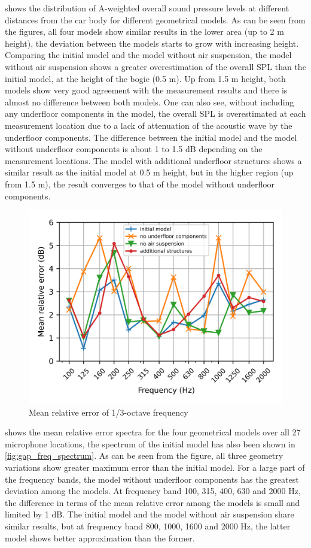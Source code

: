 \noindent{} shows the distribution of  A-weighted overall sound pressure levels at different distances from the car body for different geometrical models.%
As can be seen from the figures, all four models show similar results in the lower area (up to 2 m height), the deviation between the models starts to grow with increasing height. Comparing the initial model and the model without air suspension, the model without air suspension shows a greater overestimation of the overall SPL than the initial model, at the height of the bogie (0.5 m). Up from 1.5 m height, both models show very good agreement with the measurement results and there is almost no difference between both models. One can also see, without including any underfloor components in the model, the overall SPL is overestimated at each measurement location due to a lack of attenuation of the acoustic wave by the underfloor components. The difference between the initial model and the model without underfloor components is about 1 to 1.5 dB depending on the measurement locations. The model with additional underfloor structures shows a similar result as the initial model at 0.5 m height, but in the higher region (up from 1.5 m), the result converges to that of the model without underfloor components.

\begin{figure}[H]
	\centering
	\includegraphics[width=0.7\linewidth]{fig/chap5/geometry_variation/freq_spectrum/average_gap.png}
	\caption{Mean relative error of 1/3-octave frequency}
	\label{fig:gap_freq_spectrum_geometry}
\end{figure}

\noindent{} shows the mean relative error spectra for the four geometrical models over all 27 microphone locations, the spectrum of the initial model has also been shown in \cref{fig:gap_freq_spectrum}. As can be seen from the figure, all three geometry variations show greater maximum error than the initial model. For a large part of the frequency bands, the model without underfloor components has the greatest deviation among the models. At frequency band 100, 315, 400, 630 and 2000 Hz, the difference in terms of the mean relative error among the models is small and limited by 1 dB. The initial model and the model without air suspension share similar results, but at frequency band 800, 1000, 1600 and 2000 Hz, the latter model shows better approximation than the former.

